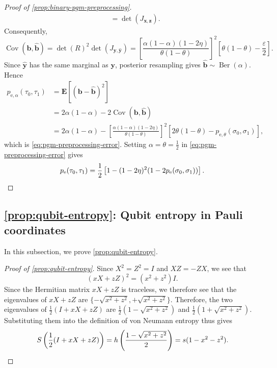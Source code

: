 \documentclass[11pt]{article}
\theoremstyle{remark}
\newcommand{\Ber}{\operatorname{Ber}}
\newcommand{\Eb}{\mathbf{E}}
\newcommand{\byhat}{\widehat{\mathbf{y}}}
\newcommand{\bbhat}{\widehat{\mathbf{b}}}
\newcommand{\bb}{\mathbf{b}}
\newcommand{\by}{\mathbf{y}}
\newcommand{\eps}{\varepsilon}
\begin{document}
\begin{proof}[Proof of \cref{prop:binary-pgm-preprocessing}]
\begin{align*}
&= \det(J_{\mathbf{x},\mathbf{z}}).
\end{align*}
Consequently,
\begin{equation*}
\operatorname{Cov}(\bb,\bbhat) = \det(R)^2\det(J_{\by,\byhat}) = \left[\frac{\alpha(1-\alpha)(1-2\eta)}{\theta(1-\theta)}\right]^2
\left[\theta(1-\theta)-\frac{\eps}{2}\right].
\end{equation*}
Since $\byhat$ has the same marginal as $\by$, posterior resampling gives $\bbhat \sim \Ber(\alpha)$. Hence
\begin{align*}
p_{\mathrm{e},\alpha}(\tau_0,\tau_1)
&= \Eb\left[(\bb-\bbhat)^2\right] \\
&= 2\alpha(1-\alpha)-2\operatorname{Cov}(\bb,\bbhat) \\
&= 2\alpha(1-\alpha) - \left[
\frac{\alpha(1-\alpha)(1-2\eta)}{\theta(1-\theta)}
\right]^2
\left[2\theta(1-\theta)-p_{\mathrm{e},\theta}(\sigma_0,\sigma_1)\right],
\end{align*}
which is \eqref{eq:pgm-preprocessing-error}. Setting $\alpha = \theta = \frac{1}{2}$ in \eqref{eq:pgm-preprocessing-error} gives
\begin{equation*}
p_{\mathrm{e}}(\tau_0,\tau_1)
= \frac{1}{2}\left[1-(1-2\eta)^2(1-2p_{\mathrm{e}}(\sigma_0,\sigma_1))\right].
\qedhere
\end{equation*}
\end{proof}

\subsection{\texorpdfstring{\cref{prop:qubit-entropy}}{Proposition }: Qubit entropy in Pauli coordinates}
\label{appsubsec:proof-qubit-entropy}

In this subsection, we prove \cref{prop:qubit-entropy}.

\begin{proof}[Proof of \cref{prop:qubit-entropy}]
Since $X^2 = Z^2 = I$ and $XZ = -ZX$, we see that
\begin{equation*}
(xX+zZ)^2 = (x^2+z^2)I.
\end{equation*}
Since the Hermitian matrix $xX+zZ$ is traceless, we therefore see that the eigenvalues of $xX+zZ$ are $\{-\sqrt{x^2+z^2},+\sqrt{x^2+z^2}\}$. Therefore, the two eigenvalues of $\frac{1}{2}(I+xX+zZ)$ are $\frac{1}{2}(1-\sqrt{x^2+z^2})$ and $\frac{1}{2}(1+\sqrt{x^2+z^2})$. Substituting them into the definition of von Neumann entropy thus gives
\begin{equation*}
S\left(\frac{1}{2}(I+xX+zZ)\right)
= h\left(\frac{1-\sqrt{x^2+z^2}}{2}\right)
= s(1-x^2-z^2).
\qedhere
\end{equation*}
\end{proof}
\end{document}
